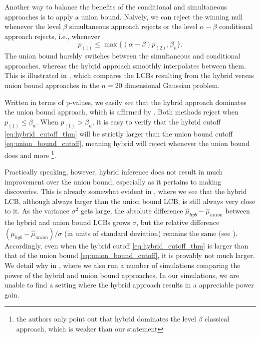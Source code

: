 \documentclass{article}
\begin{document}
Another way to balance the benefits of the conditional and simultaneous approaches is to apply a union bound. Naively, we can reject the winning null whenever the level $\beta$ simultaneous approach rejects or the level $\alpha -\beta$ conditional approach rejects, i.e., whenever
\begin{equation}
    \label{eq:union_bound_cutoff}
    p_{(1)} \leq \max\{(\alpha - \beta) p_{(2)}, \beta_n\}.
\end{equation}
The union bound harshly switches between the simultaneous and conditional approaches, whereas the hybrid approach smoothly interpolates between them. This is illustrated in , which compares the LCBs resulting from the hybrid versus union bound approaches in the $n=20$ dimensional Gaussian problem. 

Written in terms of p-values, we easily see that the hybrid approach dominates the union bound approach, which is affirmed by . Both methods reject when $p_{(1)} \leq \beta_n$. When $p_{(1)} > \beta_n$, it is easy to verify that the hybrid cutoff \eqref{eq:hybrid_cutoff_thm} will be strictly larger than the union bound cutoff \eqref{eq:union_bound_cutoff}, meaning hybrid will reject whenever the union bound does and more \footnote{the authors \cite{Andrews2023} only point out that hybrid dominates the level $\beta$ classical approach, which is weaker than our statement}. 

Practically speaking, however, hybrid inference does not result in much improvement over the union bound, especially as it pertains to making discoveries. This is already somewhat evident in , where we see that the hybrid LCB, although always larger than the union bound LCB, is still always very close to it. As the variance $\sigma^2$ gets large, the absolute difference $\hat{\mu}_{hyb} - \hat{\mu}_{union} $ between the hybrid and union bound LCBs grows $\sigma$, but the relative difference $({\mu}_{hyb} - \hat{\mu}_{union})/\sigma$   (in units of standard deviation) remains the same (see ). Accordingly, even when the hybrid cutoff \eqref{eq:hybrid_cutoff_thm} is larger than that of the union bound \eqref{eq:union_bound_cutoff}, it is provably not much larger. We detail why in , where we also run a number of simulations comparing the power of the hybrid and union bound approaches. In our simulations, we are unable to find a setting where the hybrid approach results in a appreciable power gain.  
\end{document}
